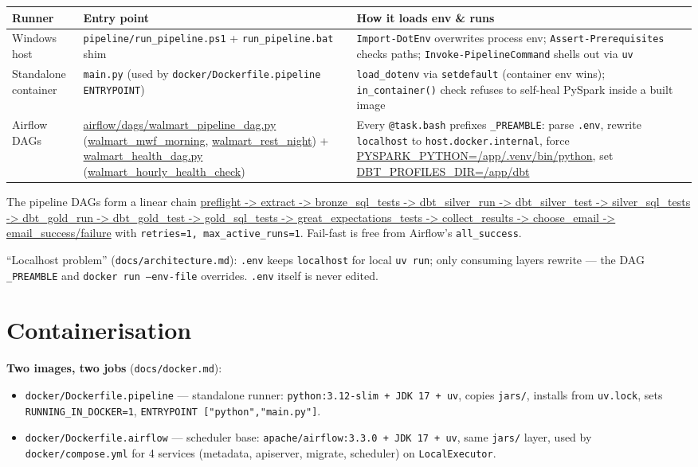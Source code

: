 \documentclass[11pt,a4paper]{article}
\begin{document}
\begin{center}
\begin{longtable}{l >{\raggedright\arraybackslash}p{5.6cm} >{\raggedright\arraybackslash}p{5.6cm}}
\toprule
Runner & Entry point & How it loads env \& runs \\
\midrule
\endhead
Windows host & \texttt{pipeline/run\_pipeline.ps1} + \texttt{run\_pipeline.bat} shim & \texttt{Import-DotEnv} overwrites process env; \texttt{Assert-Prerequisites} checks paths; \texttt{Invoke-PipelineCommand} shells out via \texttt{uv} \\
Standalone container & \texttt{main.py} (used by \texttt{docker/Dockerfile.pipeline} \texttt{ENTRYPOINT}) & \texttt{load\_dotenv} via \texttt{setdefault} (container env wins); \texttt{in\_container()} check refuses to self-heal PySpark inside a built image \\
Airflow DAGs & \url{airflow/dags/walmart_pipeline_dag.py} (\url{walmart_mwf_morning}, \url{walmart_rest_night}) + \url{walmart_health_dag.py} (\url{walmart_hourly_health_check}) & Every \texttt{@task.bash} prefixes \texttt{\_PREAMBLE}: parse \texttt{.env}, rewrite \texttt{localhost} to \texttt{host.docker.internal}, force \url{PYSPARK_PYTHON=/app/.venv/bin/python}, set \url{DBT_PROFILES_DIR=/app/dbt} \\
\bottomrule
\end{longtable}
\end{center}

The pipeline DAGs form a linear chain \url{preflight -> extract -> bronze_sql_tests -> dbt_silver_run -> dbt_silver_test -> silver_sql_tests -> dbt_gold_run -> dbt_gold_test -> gold_sql_tests -> great_expectations_tests -> collect_results -> choose_email -> email_success/failure} with \texttt{retries=1, max\_active\_runs=1}. Fail-fast is free from Airflow's \texttt{all\_success}.

``Localhost problem'' (\texttt{docs/architecture.md}): \texttt{.env} keeps \texttt{localhost} for local \texttt{uv run}; only consuming layers rewrite — the DAG \texttt{\_PREAMBLE} and \texttt{docker run --env-file} overrides. \texttt{.env} itself is never edited.

\section{Containerisation}

\textbf{Two images, two jobs} (\texttt{docs/docker.md}):
\begin{itemize}[leftmargin=1.4em]
  \item \texttt{docker/Dockerfile.pipeline} — standalone runner: \texttt{python:3.12-slim + JDK 17 + uv}, copies \texttt{jars/}, installs from \texttt{uv.lock}, sets \texttt{RUNNING\_IN\_DOCKER=1}, \texttt{ENTRYPOINT ["python","main.py"]}.
  \item \texttt{docker/Dockerfile.airflow} — scheduler base: \texttt{apache/airflow:3.3.0 + JDK 17 + uv}, same \texttt{jars/} layer, used by \texttt{docker/compose.yml} for 4 services (metadata, apiserver, migrate, scheduler) on \texttt{LocalExecutor}.
\end{itemize}
\end{document}
